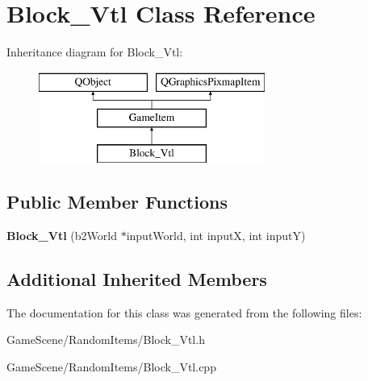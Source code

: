 \hypertarget{classBlock__Vtl}{}\section{Block\+\_\+\+Vtl Class Reference}
\label{classBlock__Vtl}
Inheritance diagram for Block\+\_\+\+Vtl\+:\begin{figure}[H]
\begin{center}
\leavevmode
\includegraphics[height=3.000000cm]{classBlock__Vtl}
\end{center}
\end{figure}
\subsection*{Public Member Functions}
\begin{DoxyCompactItemize}
\item 
{\bfseries Block\+\_\+\+Vtl} (b2\+World $\ast$input\+World, int inputX, int inputY)\hypertarget{classBlock__Vtl_ad8c12ec4204968a05785e34f613db275}{}\label{classBlock__Vtl_ad8c12ec4204968a05785e34f613db275}

\end{DoxyCompactItemize}
\subsection*{Additional Inherited Members}


The documentation for this class was generated from the following files\+:\begin{DoxyCompactItemize}
\item 
Game\+Scene/\+Random\+Items/Block\+\_\+\+Vtl.\+h\item 
Game\+Scene/\+Random\+Items/Block\+\_\+\+Vtl.\+cpp\end{DoxyCompactItemize}
